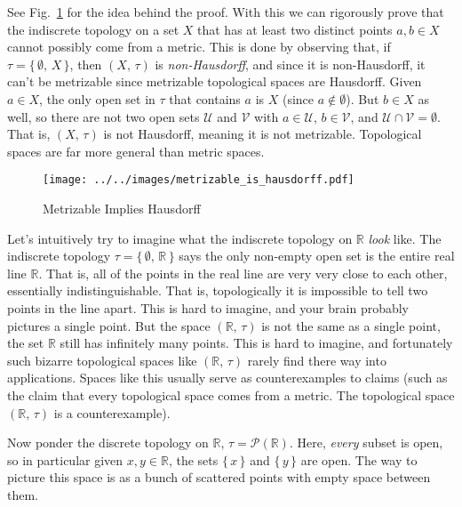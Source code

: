 \documentclass{article}
\theoremstyle{plain}
\theoremstyle{normal}
\newenvironment{example}{%
    \pushQED{\qed}\renewcommand{\qedsymbol}{$\blacksquare$}\examplex%
}{%
    \popQED\endexamplex%
}
\begin{document}
    See Fig.~\ref{fig:metrizable_is_hausdorff} for the idea behind the proof.
    With this we can rigorously prove that the indiscrete topology on a set
    $X$ that has at least two distinct points $a,b\in{X}$ cannot possibly
    come from a metric. This is done by observing that, if
    $\tau=\{\,\emptyset,\,X\,\}$, then $(X,\,\tau)$ is
    \textit{non-Hausdorff}, and since it is non-Hausdorff, it can't
    be metrizable since metrizable topological spaces are Hausdorff. Given
    $a\in{X}$, the only open set in $\tau$ that contains $a$ is
    $X$ (since $a\notin\emptyset$). But $b\in{X}$ as well, so
    there are not two open sets $\mathcal{U}$ and $\mathcal{V}$ with
    $a\in\mathcal{U}$, $b\in\mathcal{V}$, and
    $\mathcal{U}\cap\mathcal{V}=\emptyset$. That is, $(X,\,\tau)$ is not
    Hausdorff, meaning it is not metrizable. Topological spaces are
    far more general than metric spaces.
    \begin{figure}
        \centering
        \texttt{[image: ../../images/metrizable\_is\_hausdorff.pdf]}
        \caption{Metrizable Implies Hausdorff}
        \label{fig:metrizable_is_hausdorff}
    \end{figure}
    \begin{example}
        Let's intuitively try to imagine what the indiscrete
        topology on $\mathbb{R}$ \textit{look} like. The indiscrete topology
        $\tau=\{\,\emptyset,\,\mathbb{R}\,\}$ says the only non-empty open set
        is the entire real line $\mathbb{R}$. That is, all of the points in the
        real line are very very close to each other, essentially
        indistinguishable. That is, topologically it is impossible to tell
        two points in the line apart. This is hard to imagine, and your brain
        probably pictures a single point. But the space $(\mathbb{R},\,\tau)$
        is not the same as a single point, the set $\mathbb{R}$ still has
        infinitely many points. This is hard to imagine, and fortunately such
        bizarre topological spaces like $(\mathbb{R},\,\tau)$ rarely find there
        way into applications. Spaces like this usually serve as counterexamples
        to claims (such as the claim that every topological space comes from a
        metric. The topological space $(\mathbb{R},\,\tau)$ is a
        counterexample).
    \end{example}
    \begin{example}
        Now ponder the discrete topology on $\mathbb{R}$,
        $\tau=\mathcal{P}(\mathbb{R})$. Here, \textit{every} subset is open,
        so in particular given $x,y\in\mathbb{R}$, the sets
        $\{\,x\,\}$ and $\{\,y\,\}$ are open. The way to picture this space is
        as a bunch of scattered points with empty space between them.
    \end{example}
\end{document}
